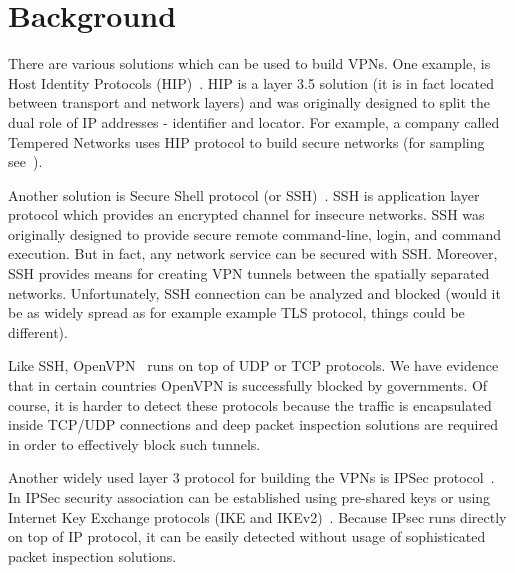 \section{Background}
\label{section:background}

There are various solutions which can be used to build VPNs.
One example, is Host Identity Protocols (HIP)~\cite{hip}. 
HIP is a layer 3.5 solution (it is in fact located between transport
and network layers) and was originally designed to 
split the dual role of IP addresses - identifier and locator.
For example, a company called Tempered Networks uses HIP protocol
to build secure networks (for sampling see~\cite{temperednetworks}).

Another solution is Secure Shell protocol (or SSH)~\cite{ssh}. SSH is
application layer protocol which provides an encrypted channel for insecure
networks. SSH was originally designed to provide secure  
remote command-line, login, and command execution. But in fact, 
any network service can be secured with SSH. Moreover, SSH provides
means for creating VPN tunnels between the spatially separated networks.
Unfortunately, SSH connection can be analyzed and blocked (would it be as 
widely spread as for example example TLS protocol, things could be different).

Like SSH, OpenVPN~\cite{openvpn} runs on top of UDP or TCP protocols.
We have evidence that in certain countries OpenVPN is successfully blocked 
by governments. Of course, it is harder to detect these protocols because 
the traffic is encapsulated inside TCP/UDP connections and deep packet
inspection solutions are required in order to effectively block such tunnels.

Another widely used layer 3 protocol for building the VPNs is IPSec 
protocol~\cite{ipsec}. In IPSec security association can be established using 
pre-shared keys or using Internet Key Exchange protocols (IKE and IKEv2)~\cite{ike}.
Because IPsec runs directly on top of IP protocol, it can be easily detected without
usage of sophisticated packet inspection solutions.
  